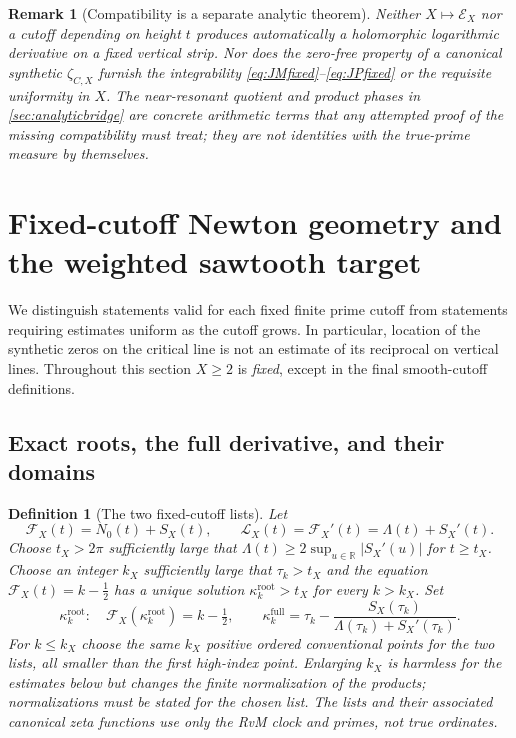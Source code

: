 \documentclass[11pt,reqno]{amsart}
\numberwithin{equation}{section}
\newtheorem{definition}[theorem]{Definition}
\newtheorem{remark}[theorem]{Remark}
\newcommand{\R}{\mathbb R}
\begin{document}
\begin{remark}[Compatibility is a separate analytic theorem]
Neither $X\mapsto \mathscr E_X$ nor a cutoff depending on height $t$
produces automatically a holomorphic logarithmic derivative on a
fixed vertical strip.  Nor does the zero-free property of a
canonical synthetic $\zeta_{C,X}$ furnish the integrability
\eqref{eq:JMfixed}--\eqref{eq:JPfixed} or the requisite
uniformity in $X$.  The near-resonant quotient and product
phases in \cref{sec:analyticbridge} are concrete arithmetic
terms that any attempted proof of the missing compatibility
must treat; they are not identities with the true-prime
measure by themselves.
\end{remark}


\section{Fixed-cutoff Newton geometry and the weighted sawtooth target}
\label{sec:fixedNewton-weighted}

We distinguish statements valid for each fixed finite prime cutoff from
statements requiring estimates uniform as the cutoff grows.  In particular,
location of the synthetic zeros on the critical line is not an estimate of
its reciprocal on vertical lines.  Throughout this section $X\ge2$ is
\emph{fixed}, except in the final smooth-cutoff definitions.

\subsection{Exact roots, the full derivative, and their domains}
\begin{definition}[The two fixed-cutoff lists]\label{def:fixed-X-lists}
Let
\begin{equation}\label{eq:v20fixed-phase}
\mathcal F_X(t)=N_0(t)+S_X(t),\qquad
\mathcal L_X(t)=\mathcal F_X'(t)=\Lambda(t)+S_X'(t).
\end{equation}
Choose $t_X>2\pi$ sufficiently large that
$\Lambda(t)\ge2\sup_{u\in\R}|S_X'(u)|$ for $t\ge t_X$.
Choose an integer $k_X$ sufficiently large that $\tau_k>t_X$
and the equation $\mathcal F_X(t)=k-\frac12$ has a unique
solution $\kappa_k^{\mathrm{root}}>t_X$ for every $k>k_X$.
Set
\begin{equation}\label{eq:v20fixed-lists}
\kappa_k^{\mathrm{root}}:\quad
 \mathcal F_X(\kappa_k^{\mathrm{root}})=k-\tfrac12,
\qquad
\kappa_k^{\mathrm{full}}=
\tau_k-\frac{S_X(\tau_k)}{\Lambda(\tau_k)+S_X'(\tau_k)}.
\end{equation}
For $k\le k_X$ choose the same $k_X$ positive ordered conventional
points for the two lists, all smaller than the first high-index point.
Enlarging $k_X$ is harmless for the estimates below but changes the
finite normalization of the products; normalizations must be stated
for the chosen list.  The lists and their associated canonical zeta
functions use only the RvM clock and primes, not true ordinates.
\end{definition}
\end{document}
